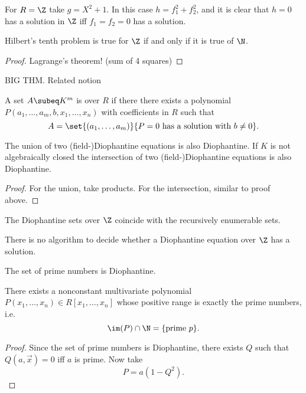 \begin{ex}
For $R=\Z$ take $g=X^2+1$. In this case $h=f_1^2+f_2^2$, and it is clear that $h=0$ has a solution in $\Z$ iff $f_1=f_2=0$ has a solution.
\end{ex}
\begin{pr}
Hilbert's tenth problem is true for $\Z$ if and only if it is true of $\N$.
\end{pr}
\begin{proof}
Lagrange's theorem! (sum of 4 squares)
\end{proof}
BIG THM.
Related notion
\begin{df}
A set $A\subeq K^m$ is  over $R$ if there there exists a polynomial $P(a_1,\ldots, a_m,b,x_1,\ldots, x_n)$ with coefficients in $R$ such that 
\[
A=\set{(a_1,\ldots, a_m)}{P=0\text{ has a solution with }b\ne 0}.
\]
\end{df}
\begin{pr}
The union of two (field-)Diophantine equations is also Diophantine. If $K$ is not algebraically closed the intersection of two (field-)Diophantine equations is also Diophantine.
\end{pr}
\begin{proof}
For the union, take products. For the intersection, similar to proof above.
\end{proof}
\begin{thm}
The Diophantine sets over $\Z$ coincide with the recursively enumerable sets.
\end{thm}
\begin{thm}
There is no algorithm to decide whether a Diophantine equation over $\Z$ has a solution.
\end{thm}
\begin{thm}
The set of prime numbers is Diophantine.
\end{thm}
\begin{thm}
There exists a nonconstant multivariate polynomial
$P(x_1,\ldots, x_n)\in R[x_1,\ldots, x_n]$ whose positive range is exactly the prime numbers, i.e.
\[
\im(P)\cap \N=\{\text{prime }p\}.
\]
\end{thm}
\begin{proof}
Since the set of prime numbers is Diophantine, there exists $Q$ such that $Q(a,\vec{x})=0$ iff $a$ is prime. Now take 
\[P=a(1-Q^2).\]
\end{proof}